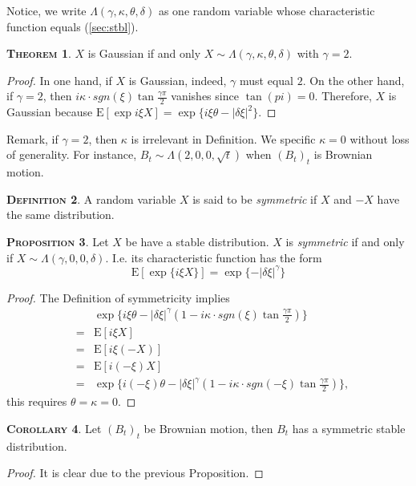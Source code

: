 \documentclass[a4paper, twoside, 11pt]{article}
\theoremstyle{definition}
\newtheorem{definition}{\scshape Definition}[section]
\newtheorem{theorem}[definition]{\scshape Theorem}
\newtheorem{proposition}[definition]{\scshape Proposition}
\newtheorem{corollary}[definition]{\scshape Corollary}
\begin{document}
Notice, we write $\Lambda(\gamma, \kappa, \theta, \delta)$ as one random variable whose characteristic function equals (\ref{sec:stbl}).

\begin{theorem}
  $X$ is Gaussian if and only $X \sim \Lambda(\gamma, \kappa, \theta, \delta)$ with $\gamma = 2$.
\end{theorem}
\begin{proof}
  In one hand, if $X$ is Gaussian, indeed, $\gamma$ must equal $2$. On the other hand, if $\gamma = 2$, then $i\kappa\cdot sgn(\xi)\tan \frac{\gamma\pi}{2}$ vanishes since $\tan(pi) = 0$. Therefore, $X$ is Gaussian because $\mathrm{E} [\exp i\xi X]=\exp\{i \xi \theta - |\delta\xi|^2\}$.
\end{proof}
Remark, if $\gamma=2$, then $\kappa$ is irrelevant in Definition. We specific $\kappa = 0$ without loss of generality. For instance, $B_t \sim \Lambda(2, 0, 0, \sqrt{t})$ when $(B_t)_t$ is Brownian motion.

\begin{definition}
  A random variable $X$ is said to be \emph{symmetric} if $X$ and $-X$ have the same distribution.
\end{definition}

\begin{proposition}
  Let $X$ be have a stable distribution. $X$ is  \emph{symmetric} if and only if $X \sim \Lambda(\gamma, 0, 0, \delta)$. I.e. its characteristic function has the form
  \begin{equation}
	\mathrm{E}[\exp\{i \xi X\}] = \exp\{-|\delta\xi|^\gamma\}
  \end{equation}
\end{proposition}
\begin{proof}
  The Definition of symmetricity implies
  \begin{eqnarray*}
	&&\exp\{i \xi \theta - |\delta\xi|^\gamma(1-i\kappa\cdot sgn(\xi)\tan \frac{\gamma\pi}{2})\}\\
	&=& \mathrm{E}[i\xi X]\\
	&=& \mathrm{E}[i\xi (-X)]\\
	&=& \mathrm{E}[i (-\xi) X]\\
	&=& \exp\{i (-\xi) \theta - |\delta\xi|^\gamma(1-i\kappa\cdot sgn(-\xi)\tan \frac{\gamma\pi}{2})\},
  \end{eqnarray*}
  this requires $\theta=\kappa=0$.
\end{proof}

\begin{corollary}
  Let $(B_t)_t$ be Brownian motion, then $B_t$ has a symmetric stable distribution.
\end{corollary}
\begin{proof}
  It is clear due to the previous Proposition.
\end{proof}
\end{document}
